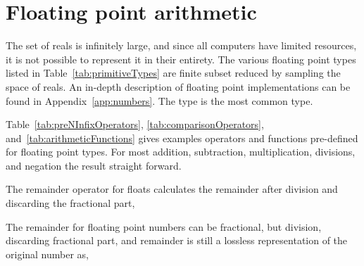 \section{Floating point arithmetic}
The set of reals is infinitely large, and since all computers have limited resources, it is not possible to represent it in their entirety. The various floating point types listed in Table~\ref{tab:primitiveTypes} are finite subset reduced by sampling the space of reals. An in-depth description of floating point implementations can be found in Appendix~\ref{app:numbers}. The type  is the most common type. 


Table~\ref{tab:preNInfixOperators}, \ref{tab:comparisonOperators}, and~\ref{tab:arithmeticFunctions} gives examples operators and functions pre-defined for floating point types. For most addition, subtraction, multiplication, divisions, and negation the result straight forward. 

The remainder operator for floats calculates the remainder after division and discarding the fractional part,
%

The remainder for floating point numbers can be fractional, but division, discarding fractional part, and remainder is still a lossless representation of the original number as,
%
%




